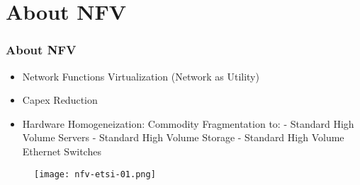 \section{About NFV}

\begin{frame}
\frametitle{About NFV}

\begin{itemize}
 \item Network Functions Virtualization (Network as Utility)
 \item Capex Reduction
 \item Hardware Homogeneization: Commodity Fragmentation to:\linebreak
	- Standard High Volume Servers\linebreak
	- Standard High Volume Storage\linebreak
	- Standard High Volume Ethernet Switches
\end{itemize}

\begin{center}
  \begin{figure}
    \texttt{[image: nfv-etsi-01.png]}
  \end{figure}
\end{center}

\end{frame}
